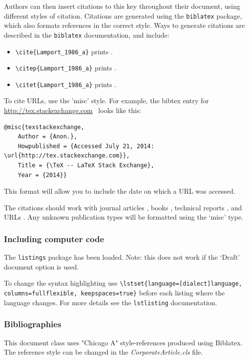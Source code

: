 Authors can then insert citations to this key throughout their document, using different styles of citation. Citations are generated using the \texttt{biblatex} package, which also formats references in the correct style.  Ways to generate citations are described in the \texttt{biblatex} documentation, and include:
\begin{itemize}
\item \verb+\cite{Lamport_1986_a}+ prints \cite{Lamport_1986_a}.
\item \verb+\citep{Lamport_1986_a}+ prints \citep{Lamport_1986_a}.
\item \verb+\citet{Lamport_1986_a}+ prints \citet{Lamport_1986_a}.
\end{itemize}

To cite URLs, use the 'misc' style. For example, the bibtex entry for \href{http://tex.stackexchange.com}{http://tex.stackexchange.com}\ \cite{texstackexchange} looks like this:

\begin{lstlisting}
@misc{texstackexchange,
	Author = {Anon.},
	Howpublished = {Accessed July 21, 2014: \url{http://tex.stackexchange.com}},
	Title = {\TeX -- LaTeX Stack Exchange},
	Year = {2014}}
\end{lstlisting}

This format will allow you to include the date on which a URL was accessed.

The citations should work with journal articles \citep{Clifton_2013_a}, books \citep{Knuth_1984_a, Lamport_1986_a, chicago}, technical reports \citep{TechReportTest}, and URLs \citep{texstackexchange}. Any unknown publication types will be formatted using the `misc' type.

\subsubsection{Including computer code}
The \texttt{listings} package has been loaded. Note: this does not work if the `Draft' document option is used.

To change the syntax highlighting use \verb+\lstset{language=[dialect]language, columns=fullflexible, keepspaces=true}+ before each listing where the language changes. For more details see the \texttt{lstlisting} documentation.

\subsubsection{Bibliographies}
This document class uses "Chicago A" style-references produced using Biblatex. The reference style can be changed in the \emph{CorporateArticle.cls} file.

